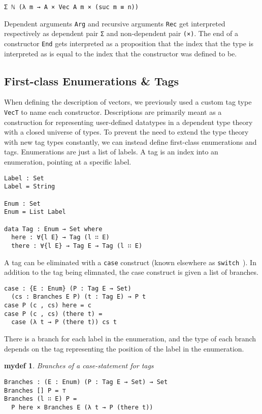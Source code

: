 \documentclass[preprint,nonatbib]{sigplanconf}
\newtheorem{mydef}{mydef}
\begin{document}
\begin{verbatim}
Σ ℕ (λ m → A × Vec A m × (suc m ≡ n))
\end{verbatim}

Dependent arguments {\tt Arg} and recursive arguments
{\tt Rec} get interpreted respectively as dependent pair
{\tt Σ} and non-dependent pair {\tt (×)}. The end of a constructor
{\tt End} gets interpreted as a proposition that the index that the
type is interpreted as is equal to the index that the constructor was
defined to be.

\subsection{First-class Enumerations \& Tags}
\label{sec:background:case}

When defining the description of vectors, we previously used a custom
tag type {\tt VecT} to name each constructor. Descriptions are
primarily meant as a construction for representing user-defined
datatypes in a dependent type theory with a closed universe of types.
To prevent the need to extend the type theory with new tag types
constantly, we can instead define first-class enumerations and tags.
Enumerations are just a list of labels. A tag is an index into an
enumeration, pointing at a specific label.

\begin{verbatim}
Label : Set
Label = String

Enum : Set
Enum = List Label

data Tag : Enum → Set where
  here : ∀{l E} → Tag (l ∷ E)
  there : ∀{l E} → Tag E → Tag (l ∷ E)
\end{verbatim}

A tag can be eliminated with a {\tt case} construct (known elsewhere as
{\tt switch}~\citep{Chapman:2010:GAL:1932681.1863547,dagand:phd}).
In addition to the tag being elimnated, the case construct is given a
list of branches.

\begin{verbatim}
case : {E : Enum} (P : Tag E → Set)
  (cs : Branches E P) (t : Tag E) → P t
case P (c , cs) here = c
case P (c , cs) (there t) =
  case (λ t → P (there t)) cs t
\end{verbatim}

There is a branch for each label in the enumeration, and the type of
each branch depends on the tag representing the position of the label
in the enumeration.

\begin{mydef}\label{def:branches}
Branches of a case-statement for tags

\begin{verbatim}
Branches : (E : Enum) (P : Tag E → Set) → Set
Branches [] P = ⊤
Branches (l ∷ E) P =
  P here × Branches E (λ t → P (there t))
\end{verbatim}

\end{mydef}
\end{document}
